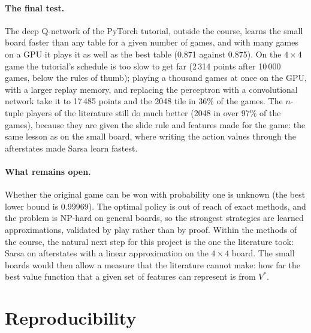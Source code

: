 \documentclass[11pt,a4paper]{article}
\theoremstyle{remark}
\begin{document}
\paragraph{The final test.} The deep Q-network of the PyTorch tutorial, outside the course, learns the small board faster than any table for a given number of games, and with many games on a GPU it plays it as well as the best table (0.871 against 0.875). On the $4\times4$ game the tutorial's schedule is too slow to get far (2\,314 points after 10\,000 games, below the rules of thumb); playing a thousand games at once on the GPU, with a larger replay memory, and replacing the perceptron with a convolutional network take it to 17\,485 points and the 2048 tile in 36\% of the games. The $n$-tuple players of the literature still do much better (2048 in over 97\% of the games), because they are given the slide rule and features made for the game: the same lesson as on the small board, where writing the action values through the afterstates made Sarsa learn fastest.

\paragraph{What remains open.} Whether the original game can be won with probability one is unknown (the best lower bound is 0.99969). The optimal policy is out of reach of exact methods, and the problem is NP-hard on general boards, so the strongest strategies are learned approximations, validated by play rather than by proof. Within the methods of the course, the natural next step for this project is the one the literature took: Sarsa on afterstates with a linear approximation on the $4\times4$ board. The small boards would then allow a measure that the literature cannot make: how far the best value function that a given set of features can represent is from $V^*$.

\appendix
\section{Reproducibility}
\end{document}
